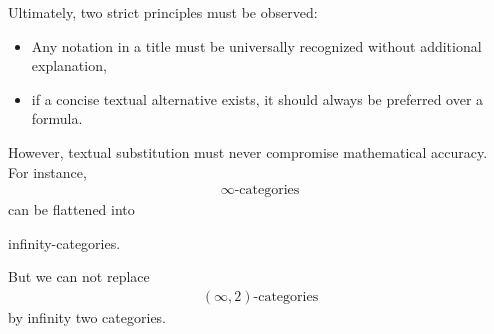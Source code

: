 \documentclass[11pt, a4paper]{article}
\begin{document}
Ultimately, two strict principles must be observed: 
\begin{itemize}
    \item Any notation in a title must be universally recognized without additional explanation,
    \item if a concise textual alternative exists, it should always be preferred over a formula.
\end{itemize}
However, textual substitution must never compromise mathematical accuracy. For instance, 
\begin{align*}
    \infty\text{-categories}
\end{align*}
can be flattened into
\begin{center}
    infinity-categories.
\end{center}
But we can not replace 
\begin{align*}
    (\infty,2)\text{-categories}
\end{align*}
by infinity two categories.
\end{document}
